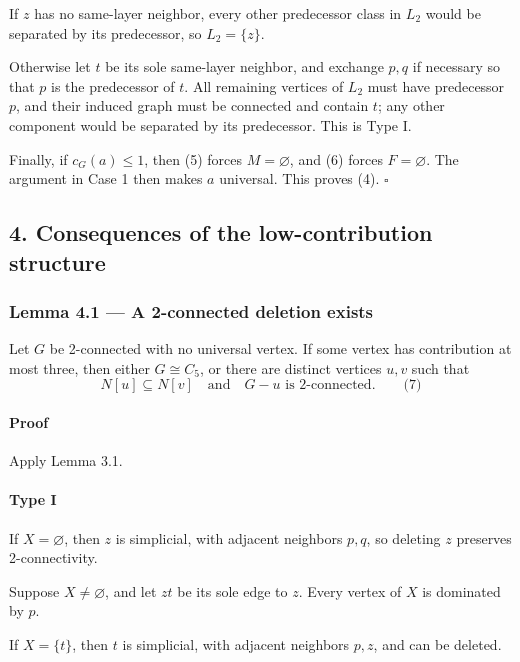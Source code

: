 \documentclass[
  11pt,
  a4paper,
]{article}
\begin{document}
If \(z\) has no same-layer neighbor, every other predecessor class in
\(L_2\) would be separated by its predecessor, so \(L_2=\{z\}\).

Otherwise let \(t\) be its sole same-layer neighbor, and exchange
\(p,q\) if necessary so that \(p\) is the predecessor of \(t\). All
remaining vertices of \(L_2\) must have predecessor \(p\), and their
induced graph must be connected and contain \(t\); any other component
would be separated by its predecessor. This is Type I.

Finally, if \(c_G(a)\le1\), then (5) forces \(M=\varnothing\), and (6)
forces \(F=\varnothing\). The argument in Case 1 then makes \(a\)
universal. This proves (4). \(\square\)

\subsection{4. Consequences of the low-contribution
structure}\label{consequences-of-the-low-contribution-structure}

\subsubsection{Lemma 4.1 --- A 2-connected deletion
exists}\label{lemma-4.1-a-2-connected-deletion-exists}

Let \(G\) be 2-connected with no universal vertex. If some vertex has
contribution at most three, then either \(G\cong C_5\), or there are
distinct vertices \(u,v\) such that \[
N[u]\subseteq N[v]
\quad\text{and}\quad
G-u\text{ is 2-connected}.
\qquad\text{(7)}
\]

\paragraph{Proof}\label{proof-2}

Apply Lemma 3.1.

\paragraph{Type I}\label{type-i-1}

If \(X=\varnothing\), then \(z\) is simplicial, with adjacent neighbors
\(p,q\), so deleting \(z\) preserves 2-connectivity.

Suppose \(X\ne\varnothing\), and let \(zt\) be its sole edge to \(z\).
Every vertex of \(X\) is dominated by \(p\).

If \(X=\{t\}\), then \(t\) is simplicial, with adjacent neighbors
\(p,z\), and can be deleted.
\end{document}

